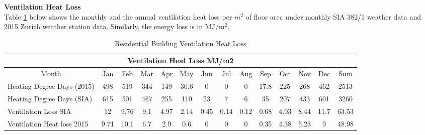 \documentclass[11pt, a4paper]{article}
\theoremstyle{definition}
\begin{document}
		\textbf{Ventilation Heat Loss}\\
		Table \ref{tab:HonggVentLoss380} below shows the monthly and the annual ventilation heat loss per $m^2$ of floor area under monthly SIA 382/1 weather data and 2015 Zurich weather station data. Similarly, the energy loss is in MJ/m$^2$.\\
		\begin{table}[H]
		\centering
		\small
		\caption{Residential Building Ventilation Heat Loss}
		    \begin{tabular}{|p{6.855em}ccccccccccccc|}
		    \toprule
		    \multicolumn{14}{|c|}{Ventilation Heat Loss MJ/m2} \\
		    \midrule
		    \multicolumn{1}{|c}{Month} & Jan  & Feb  & Mar  & Apr  & May  & Jun  & Jul  & Aug  & Sep  & Oct  & Nov  & Dec  & Sum \\
		    \midrule
		    Heating Degree Days (2015) & 498  & 519  & 344  & 149  & 30.6 & 0    & 0    & 0    & 17.8 & 225  & 268  & 462  & 2513 \\
		    Heating Degree Days (SIA) & 615  & 501  & 467  & 255  & 110  & 23   & 7    & 6    & 35   & 207  & 433  & 601  & 3260 \\
		    Ventilation Loss SIA & 12   & 9.76 & 9.1  & 4.97 & 2.14 & 0.45 & 0.14 & 0.12 & 0.68 & 4.03 & 8.44 & 11.7 & 63.53 \\
		    Ventilation Heat loss 2015 & 9.71 & 10.1 & 6.7  & 2.9  & 0.6  & 0    & 0    & 0    & 0.35 & 4.38 & 5.23 & 9    & 48.98 \\
		    \bottomrule
		    \end{tabular}%

		  \label{tab:HonggVentLoss380}%
		\end{table}%
\end{document}
